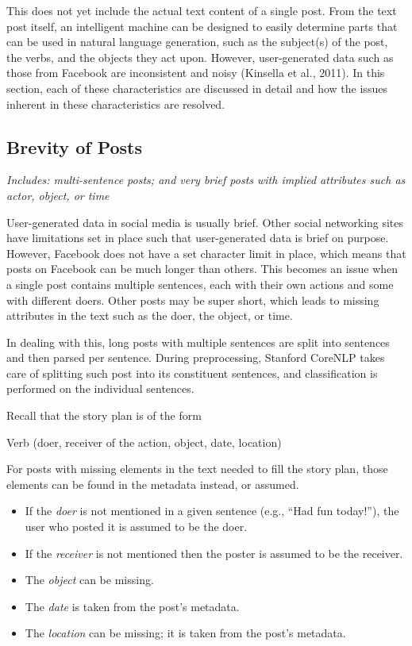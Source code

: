 This does not yet include the actual text content of a single post. From the text post itself, an intelligent machine can be designed to easily determine parts that can be used in natural language generation, such as the subject(s) of the post, the verbs, and the objects they act upon. However, user-generated data such as those from Facebook are inconsistent and noisy (Kinsella et al., 2011). In this section, each of these characteristics are discussed in detail and how the issues inherent in these characteristics are resolved.

\subsection{Brevity of Posts}
\textit{Includes: multi-sentence posts; and very brief posts with implied attributes such as actor, object, or time}

User-generated data in social media is usually brief. Other social networking sites have limitations set in place such that user-generated data is brief on purpose. However, Facebook does not have a set character limit in place, which means that posts on Facebook can be much longer than others. This becomes an issue when a single post contains multiple sentences, each with their own actions and some with different doers. Other posts may be super short, which leads to missing attributes in the text such as the doer, the object, or time.

In dealing with this, long posts with multiple sentences are split into sentences and then parsed per sentence. During preprocessing, Stanford CoreNLP takes care of splitting such post into its constituent sentences, and classification is performed on the individual sentences.

Recall that the story plan is of the form
\begin{center} Verb (doer, receiver of the action, object, date, location) \end{center}

For posts with missing elements in the text needed to fill the story plan, those elements can be found in the metadata instead, or assumed. 
\begin{itemize}
	\item If the \textit{doer} is not mentioned in a given sentence (e.g., ``Had fun today!''), the user who posted it is assumed to be the doer.
	\item If the \textit{receiver} is not mentioned then the poster is assumed to be the receiver.
	\item The \textit{object} can be missing.
	\item The \textit{date} is taken from the post's metadata.
	\item The \textit{location} can be missing; it is taken from the post's metadata.
\end{itemize}

